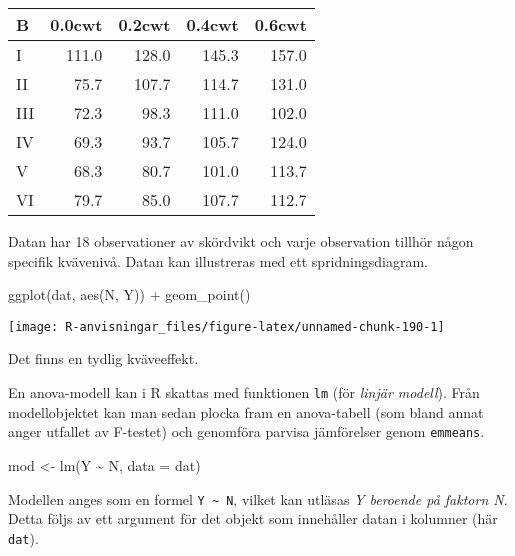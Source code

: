 \documentclass[
]{book}
\newenvironment{Shaded}{\begin{snugshade}}{\end{snugshade}}
\newcommand{\AttributeTok}[1]{\textcolor[rgb]{0.77,0.63,0.00}{#1}}
\newcommand{\FunctionTok}[1]{\textcolor[rgb]{0.00,0.00,0.00}{#1}}
\newcommand{\NormalTok}[1]{#1}
\newcommand{\OtherTok}[1]{\textcolor[rgb]{0.56,0.35,0.01}{#1}}
\newcommand{\SpecialCharTok}[1]{\textcolor[rgb]{0.00,0.00,0.00}{#1}}
\theoremstyle{definition}
\theoremstyle{definition}
\theoremstyle{definition}
\theoremstyle{definition}
\theoremstyle{remark}
\begin{document}
\begin{table}
\centering
\begin{tabular}[t]{lrrrr}
\toprule
B & 0.0cwt & 0.2cwt & 0.4cwt & 0.6cwt\\
\midrule
I & 111.0 & 128.0 & 145.3 & 157.0\\
II & 75.7 & 107.7 & 114.7 & 131.0\\
III & 72.3 & 98.3 & 111.0 & 102.0\\
IV & 69.3 & 93.7 & 105.7 & 124.0\\
V & 68.3 & 80.7 & 101.0 & 113.7\\
\addlinespace
VI & 79.7 & 85.0 & 107.7 & 112.7\\
\bottomrule
\end{tabular}
\end{table}

Datan har 18 observationer av skördvikt och varje observation tillhör någon specifik kvävenivå. Datan kan illustreras med ett spridningsdiagram.

\begin{Shaded}
\begin{Highlighting}[]
\FunctionTok{ggplot}\NormalTok{(dat, }\FunctionTok{aes}\NormalTok{(N, Y)) }\SpecialCharTok{+}
  \FunctionTok{geom\_point}\NormalTok{()}
\end{Highlighting}
\end{Shaded}

\begin{center}\texttt{[image: R-anvisningar\_files/figure-latex/unnamed-chunk-190-1]} \end{center}

Det finns en tydlig kväveeffekt.

En anova-modell kan i R skattas med funktionen \texttt{lm} (för \emph{linjär modell}). Från modellobjektet kan man sedan plocka fram en anova-tabell (som bland annat anger utfallet av F-testet) och genomföra parvisa jämförelser genom \texttt{emmeans}.

\begin{Shaded}
\begin{Highlighting}[]
\NormalTok{mod }\OtherTok{\textless{}{-}} \FunctionTok{lm}\NormalTok{(Y }\SpecialCharTok{\textasciitilde{}}\NormalTok{ N, }\AttributeTok{data =}\NormalTok{ dat)}
\end{Highlighting}
\end{Shaded}

Modellen anges som en formel \texttt{Y\ \textasciitilde{}\ N}, vilket kan utläsas \emph{Y beroende på faktorn N}. Detta följs av ett argument för det objekt som innehåller datan i kolumner (här \texttt{dat}).
\end{document}

